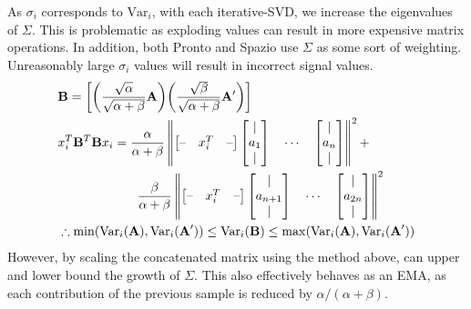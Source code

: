 As $\sigma_i$ corresponds to $\text{Var}_i$, with each iterative-SVD, we
increase the eigenvalues of $\Sigma$. This is problematic as exploding values
can result in more expensive matrix operations. In addition, both Pronto and
Spazio use $\Sigma$ as some sort of weighting. Unreasonably large $\sigma_i$
values will result in incorrect signal values.
\begin{align}
    & \textbf{B} = \left[\bigg(\frac{\sqrt{\alpha}}{\sqrt{\alpha +
    \beta}}\mathbf{A}\bigg)\bigg(\frac{\sqrt{\beta}}{\sqrt{\alpha +
    \beta}}\mathbf{A'}\bigg)\right] \\
& x_i^T \mathbf{B}^T\mathbf{B} x_i = \frac{\alpha}{\alpha + \beta}\left\| \begin{bmatrix}
\text{--} & x_i^T & \text{--} \\
\end{bmatrix}
\begin{bmatrix}
| \\
a_1 \\
|
\end{bmatrix} \quad \cdots \quad
\begin{bmatrix}
| \\
a_{n} \\
|
\end{bmatrix} \right\|^2 + \\
& \hspace{2.2cm} \frac{\beta}{\alpha + \beta}\left\| \begin{bmatrix}
\text{--} & x_i^T & \text{--} \\
\end{bmatrix}
\begin{bmatrix}
| \\
a_{n+1} \\
|
\end{bmatrix} \quad \cdots \quad
\begin{bmatrix}
| \\
a_{2n} \\
|
\end{bmatrix} \right\|^2\\
    &\therefore \min(\text{Var}_i(\textbf{A}), \text{Var}_i(\textbf{A}')) \leq
    \text{Var}_i(\textbf{B}) \leq \max(\text{Var}_i(\textbf{A}),
    \text{Var}_i(\textbf{A}'))
\end{align}
However, by scaling the concatenated matrix using the method above, can upper
and lower bound the growth of $\Sigma$. This also effectively behaves as an EMA,
as each contribution of the previous sample is reduced by $\alpha / (\alpha +
\beta)$.

